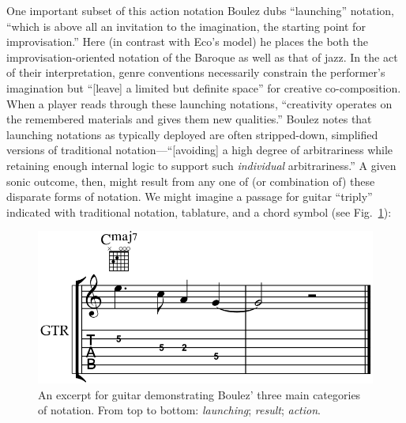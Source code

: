     One important subset of this action notation Boulez dubs ``launching'' notation, ``which is above all an invitation to the imagination, the starting point for improvisation.'' Here (in contrast with Eco's model) he places the both the improvisation-oriented notation of the Baroque as well as that of jazz. In the act of their interpretation, genre conventions necessarily constrain the performer's imagination but ``[leave] a limited but definite space'' for creative co-composition. When a player reads through these launching notations, ``creativity operates on the remembered materials and gives them new qualities.'' Boulez notes that launching notations as typically deployed are often stripped-down, simplified versions of traditional notation---``[avoiding] a high degree of arbitrariness while retaining enough internal logic to support such \textit{individual} arbitrariness.''\autocite[530]{Boulez_Nattiez_2019} A given sonic outcome, then, might result from any one of (or combination of) these disparate forms of notation. We might imagine a passage for guitar ``triply'' indicated with traditional notation, tablature, and a chord symbol (see Fig.~\ref{fig:guitarnotation}):

            \begin{figure} 
            \centering
            \includegraphics[width=.6\textwidth]{images/chapter2/guitarnotation.png}
            \captionsetup{width=.5\textwidth}
            \caption{An excerpt for guitar demonstrating Boulez' three main categories of notation. From top to bottom: \textit{launching}; \textit{result}; \textit{action}.}
            \label{fig:guitarnotation}
        \end{figure}

